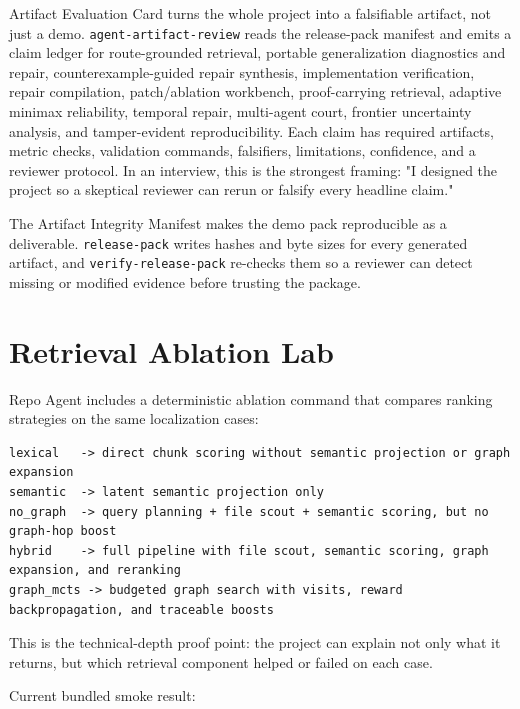 \documentclass[UTF8,12pt,openany]{ctexbook}
\begin{document}
Artifact Evaluation Card turns the whole project into a falsifiable artifact, not just a demo. \texttt{agent-artifact-review} reads the release-pack manifest and emits a claim ledger for route-grounded retrieval, portable generalization diagnostics and repair, counterexample-guided repair synthesis, implementation verification, repair compilation, patch/ablation workbench, proof-carrying retrieval, adaptive minimax reliability, temporal repair, multi-agent court, frontier uncertainty analysis, and tamper-evident reproducibility. Each claim has required artifacts, metric checks, validation commands, falsifiers, limitations, confidence, and a reviewer protocol. In an interview, this is the strongest framing: "I designed the project so a skeptical reviewer can rerun or falsify every headline claim."\par

The Artifact Integrity Manifest makes the demo pack reproducible as a deliverable. \texttt{release-pack} writes hashes and byte sizes for every generated artifact, and \texttt{verify-release-pack} re-checks them so a reviewer can detect missing or modified evidence before trusting the package.\par

\section{Retrieval Ablation Lab}

Repo Agent includes a deterministic ablation command that compares ranking strategies on the same localization cases:\par

\begin{lstlisting}
lexical   -> direct chunk scoring without semantic projection or graph expansion
semantic  -> latent semantic projection only
no_graph  -> query planning + file scout + semantic scoring, but no graph-hop boost
hybrid    -> full pipeline with file scout, semantic scoring, graph expansion, and reranking
graph_mcts -> budgeted graph search with visits, reward backpropagation, and traceable boosts
\end{lstlisting}

This is the technical-depth proof point: the project can explain not only what it returns, but which retrieval component helped or failed on each case.\par

Current bundled smoke result:\par
\end{document}
